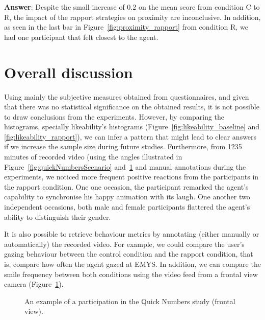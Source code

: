 \textbf{Answer}: Despite the small increase of 0.2 on the mean score from condition C to R, the impact of the rapport strategies on proximity are inconclusive. In addition, as seen in the last bar in Figure~\ref{fig:proximity_rapport} from condition R, we had one participant that felt closest to the agent.

\section{Overall discussion}

Using mainly the subjective measures obtained from questionnaires, and given that there was no statistical significance on the obtained results, it is not possible to draw  conclusions from the experiments. However, by comparing the histograms, specially likeability’s histograms (Figure~\ref{fig:likeability_baseline} and \ref{fig:likeability_rapport}), we can infer a pattern that might lead to clear answers if we increase the sample size during future studies. Furthermore, from 1235 minutes of recorded video (using the angles illustrated in Figure~\ref{fig:quickNumbersScenario} and~\ref{fig:quickNumbersScenarioCloseup} and manual annotations during the experiments, we noticed more frequent positive reactions from the participants in the rapport condition. One one occasion, the participant remarked the agent's capability to synchronise his happy animation with its laugh. One another two independent occasions, both male and female participants flattered the agent's ability to distinguish their gender.

It is also possible to retrieve behaviour metrics by annotating (either manually or automatically) the recorded video. For example, we could compare the user's gazing behaviour between the control condition and the rapport condition, that is, compare how often the agent gazed at \ac{EMYS}. In addition, we can compare the smile frequency between both conditions using the video feed from a frontal view camera (Figure~\ref{fig:quickNumbersScenarioCloseup}).

\begin{figure}[H]
	\centering
	\caption{An example of a participation in the Quick Numbers study (frontal view).}
	\label{fig:quickNumbersScenarioCloseup}
\end{figure}

